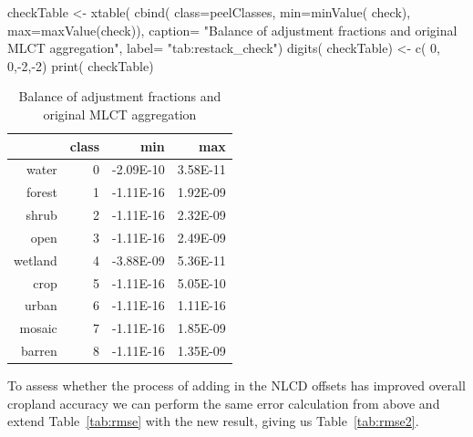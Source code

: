 \begin{Schunk}
\begin{Sinput}
 checkTable <-
   xtable( cbind( class=peelClasses,
                 min=minValue( check),
                 max=maxValue(check)),
          caption= "Balance of adjustment fractions and original MLCT aggregation", 
          label= "tab:restack_check")
 digits( checkTable) <- c( 0, 0,-2,-2)
 print( checkTable)
\end{Sinput}
\begin{table}[ht]
\begin{center}
\begin{tabular}{rrrr}
  \hline
 & class & min & max \\ 
  \hline
water & 0 & -2.09E-10 & 3.58E-11 \\ 
  forest & 1 & -1.11E-16 & 1.92E-09 \\ 
  shrub & 2 & -1.11E-16 & 2.32E-09 \\ 
  open & 3 & -1.11E-16 & 2.49E-09 \\ 
  wetland & 4 & -3.88E-09 & 5.36E-11 \\ 
  crop & 5 & -1.11E-16 & 5.05E-10 \\ 
  urban & 6 & -1.11E-16 & 1.11E-16 \\ 
  mosaic & 7 & -1.11E-16 & 1.85E-09 \\ 
  barren & 8 & -1.11E-16 & 1.35E-09 \\ 
   \hline
\end{tabular}
\caption{Balance of adjustment fractions and original MLCT aggregation}
\label{tab:restack_check}
\end{center}
\end{table}\begin{Sinput}
   
\end{Sinput}
\end{Schunk}

To assess whether the process of adding in the NLCD offsets has
improved overall cropland accuracy we can perform the same error
calculation from above and extend Table~\ref{tab:rmse} with the new
result, giving us Table~\ref{tab:rmse2}.


